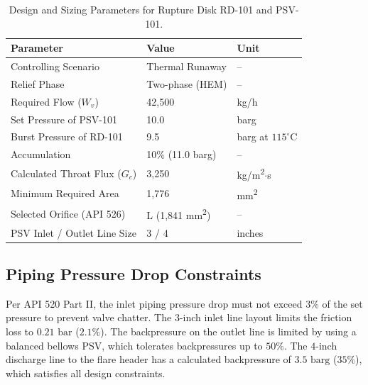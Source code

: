 \begin{table}[htbp]
\centering
\caption{Design and Sizing Parameters for Rupture Disk RD-101 and PSV-101.}
\label{tab:relief_parameters}
\small
\begin{tabularx}{0.85\textwidth}{Xll}
\toprule
\textbf{Parameter} & \textbf{Value} & \textbf{Unit} \\
\midrule
Controlling Scenario & Thermal Runaway & -- \\
Relief Phase & Two-phase (HEM) & -- \\
Required Flow ($W_v$) & 42,500 & kg/h \\
Set Pressure of PSV-101 & 10.0 & barg \\
Burst Pressure of RD-101 & 9.5 & barg at $115^\circ\text{C}$ \\
Accumulation & 10\% (11.0 barg) & -- \\
Calculated Throat Flux ($G_c$) & 3,250 & kg/m\textsuperscript{2}$\cdot$s \\
Minimum Required Area & 1,776 & mm\textsuperscript{2} \\
Selected Orifice (API 526) & L (1,841 mm\textsuperscript{2}) & -- \\
PSV Inlet / Outlet Line Size & 3 / 4 & inches \\
\bottomrule
\end{tabularx}
\end{table}

\subsection{Piping Pressure Drop Constraints}
Per API 520 Part II, the inlet piping pressure drop must not exceed $3\%$ of the set pressure to prevent valve chatter. The $3$-inch inlet line layout limits the friction loss to $0.21 \text{ bar}$ ($2.1\%$). The backpressure on the outlet line is limited by using a balanced bellows PSV, which tolerates backpressures up to $50\%$. The $4$-inch discharge line to the flare header has a calculated backpressure of $3.5 \text{ barg}$ ($35\%$), which satisfies all design constraints.
